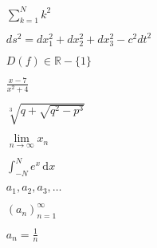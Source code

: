\documentclass{article}
\begin{document}
$$
\begin{equation} %
    \begin{split}
        \sum_{k=1}^N k^2 \\
        \\
        ds^2 = dx_1^2 + dx_2^2 + dx_3^2 - c^2 dt^2 \\
        \\
        D(f)\in\mathbb{R}-\{1\} \\
        \\
         \frac{x - 7}{x^2 + 4} \\
         \\
         \sqrt[3]{q + \sqrt{ q^2 - p^3 }}\\
         \\
         \lim_{n \to \infty}x_n \\
         \\
         \int_{-N}^{N} e^x\, \mathrm{d}x \\
         \\
         a_1, a_2, a_3, \dots \\
         \\
         (a_n)_{n=1}^{\infty} \\
         \\
         a_n = \frac{1}{n}
    \end{split}
    
\end{equation}
\end{document}
